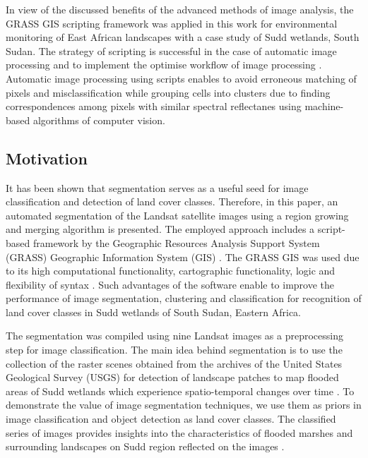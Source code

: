 \documentclass[analytics,article,submit,pdftex,moreauthors]{Definitions/mdpi}
\begin{document}
In view of the discussed benefits of the advanced methods of image analysis, the GRASS GIS scripting framework was applied in this work for environmental monitoring of East African landscapes with a case study of Sudd wetlands, South Sudan. The strategy of scripting is successful in the case of automatic image processing and to implement the optimise workflow of image processing \cite{Borcard,ijgi11090473}. Automatic image processing using scripts enables to avoid erroneous matching of pixels and misclassification while grouping cells into clusters due to finding correspondences among pixels with similar spectral reflectanes using machine-based algorithms of computer vision.

\subsection{Motivation} 

It has been shown that segmentation serves as a useful seed for image classification and detection of land cover classes. Therefore, in this paper, an automated segmentation of the Landsat satellite images using a region growing and merging algorithm is presented. The employed approach includes a script-based framework by the Geographic Resources Analysis Support System (GRASS) Geographic Information System (GIS) \cite{Neteleretal2008}. The GRASS GIS was used due to its high computational functionality, cartographic functionality, logic and flexibility of syntax \cite{NetelerMitasova2008}. Such advantages of the software enable to improve the performance of image segmentation, clustering and classification for recognition of land cover classes in Sudd wetlands of South Sudan, Eastern Africa. 

The segmentation was compiled using nine Landsat images as a preprocessing step for image classification. The main idea behind segmentation is to use the collection of the raster scenes obtained from the archives of the United States Geological Survey (USGS) for detection of landscape patches to map flooded areas of Sudd wetlands which experience spatio-temporal changes over time \cite{Petersen,SOSNOWSKI201651,Mulatu}. To demonstrate the value of image segmentation techniques, we use them as priors in image classification and object detection as land cover classes. The classified series of images provides insights into the characteristics of flooded marshes and surrounding landscapes on Sudd region reflected on the images \cite{CHEN201417}. 
\end{document}
